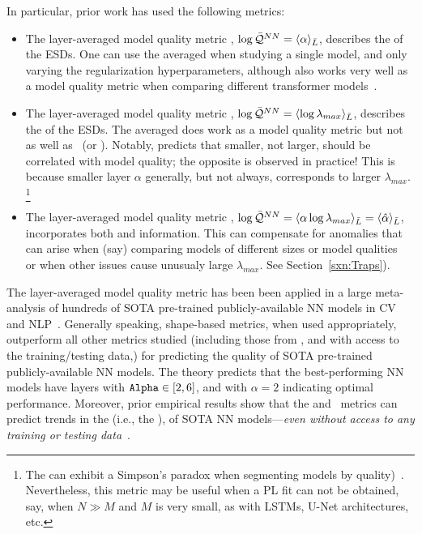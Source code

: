 In particular, prior work has used the following metrics:
\begin{itemize}
\item
The layer-averaged model quality metric \ALPHA, $\log\bar{\mathcal{Q}}^{NN}=\langle\alpha\rangle_{\bar{L}}$, describes the \SHAPE of the ESDs.
One can use the averaged \ALPHA when studying a single model, and only varying the regularization hyperparameters, although \ALPHA also works very well as a model quality metric when comparing different transformer models~\cite{YHTx21_TR}.
\item
The layer-averaged model quality metric \LOGSPECTRALNORM, $\log\bar{\mathcal{Q}}^{NN}=\langle\log\lambda_{max}\rangle_{\bar{L}}$, describes the \SCALE of the ESDs.
The averaged \LOGSPECTRALNORM does work as a model quality metric but not as well as \ALPHA~(or \ALPHAHAT).
Notably, \SLT predicts that smaller, not larger, \LOGSPECTRALNORM should be correlated with model quality; the opposite is observed in practice!
This is because smaller layer $\alpha$ generally, but not always, corresponds to larger $\lambda_{max}$.%
\footnote{The \LOGSPECTRALNORM can exhibit a Simpson's paradox when segmenting models by quality)~\cite{MM21a_simpsons_TR}.  Nevertheless, this metric may be useful when a PL fit can not be obtained, say, when $N\gg M$ and $M$ is very small, as with LSTMs,  U-Net architectures, etc.}
\item
The layer-averaged model quality metric \ALPHAHAT, $\log\bar{\mathcal{Q}}^{NN}=\langle\alpha\log\lambda_{max}\rangle_{\bar{L}}=\langle\hat{\alpha}\rangle_{\bar{L}}$, incorporates both \SHAPE and \SCALE information.
This can compensate for anomalies that can arise when (say) comparing models of different sizes or model qualities~\cite{MM21a_simpsons_TR} or when other issues cause unusualy large $\lambda_{max}$. See Section~\ref{sxn:Traps}).
\end{itemize}

\noindent
The layer-averaged \ALPHAHAT model quality metric has been been applied in a large meta-analysis of hundreds of SOTA 
pre-trained publicly-available NN models in CV and NLP~\cite{MM20a_trends_NatComm,YTHx22_TR,YTHx23_KDD,MM19a_TR}. 
%
Generally speaking, \HTSR shape-based metrics, when used appropriately, outperform all other metrics studied (including 
those from \SLT, and with access to the training/testing data,) for predicting the quality of SOTA pre-trained publicly-available NN models.  
%
The \HTSR theory predicts that the best-performing NN models have layers with $\texttt{Alpha}\in[2,6]$, and with $\alpha=2$
indicating optimal performance.
Moreover, prior empirical results show that the \ALPHA and \ALPHAHAT~metrics can predict trends in the \Quality 
(i.e., the \GeneralizationAccuracy), of SOTA NN models---\emph{even without access to any training or testing data}~\cite{MM20a_trends_NatComm}.



